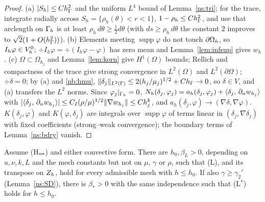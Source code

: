 \begin{proof}
(a) $|S_h|\le Ch_\Gamma^2$ and the uniform $L^4$ bound of Lemma~\ref{ns:tri}; for the trace, integrate radially across $S_h=\{\rho_h(\theta)<r<1\}$, $1-\rho_h\le Ch_\Gamma^2$, and use that arclength on $\Gamma_h$ is at least $\rho_h\,d\theta\ge\frac12d\theta$ (with $ds\ge\rho_h\,d\theta$ the constant $2$ improves to $\sqrt2(1+O(h_\Gamma^2))$). (b) Elements meeting $\operatorname{supp}\varphi$ do not touch $\partial\Omega_h$, so $I_h\varphi\in V_h^0$; $\div I_h\varphi=\div(I_h\varphi-\varphi)$ has zero mean and Lemma~\ref{lem:infsup} gives $w_h$. (c) $\Omega\subset\Omega_{h_j}$ and Lemma~\ref{lem:korn} give $H^1(\Omega)$ bounds; Rellich and compactness of the trace give strong convergence in $L^2(\Omega)$ and $L^2(\partial\Omega)$; $\div\delta=0$; by (a) and \eqref{nb:hmu}, $\lVert \delta_j\rVert_{L^2(\Gamma)}\le2(h_j/\mu_j)^{1/2}+Ch_\Gamma\to0$, so $\delta\in V$, and (a) transfers the $L^2$ norms. Since $\varphi_j|_{\Gamma_h}=0$, $N_h(\delta_j,\varphi_j)=a_h(\delta_j,\varphi_j)+\langle \delta_j,\, \partial_n w_{h_j}\rangle$ with $|\langle \delta_j,\, \partial_n w_{h_j}\rangle|\le C_I(\rho/\mu)^{1/2}\lVert \nabla w_{h_j}\rVert\le Ch_j^k$, and $a_h(\delta_j,\varphi)\to(\nabla\delta,\nabla\varphi)$. $K(\delta_j,\varphi)$ and $K(\varphi,\delta_j)$ are integrals over $\operatorname{supp}\varphi$ of terms linear in $(\delta_j,\nabla\delta_j)$ with fixed coefficients (strong--weak convergence); the boundary terms of Lemma~\ref{ns:bdry} vanish.
\end{proof}

\begin{theorem}\label{nb:L}
Assume (H$_{\rm ns}$) and either convective form. There are $h_0,\beta_L>0$, depending on $u,\nu,k,L$ and the mesh constants but not on $\mu$, $\gamma$ or $\rho$, such that (L), and its transpose on $Z_h$, hold for every admissible mesh with $h\le h_0$. If also $\gamma\ge\gamma_2'$ (Lemma~\ref{ns:SD}), there is $\beta_\ast>0$ with the same independence such that (L$^\ast$) holds for $h\le h_0$.
\end{theorem}

